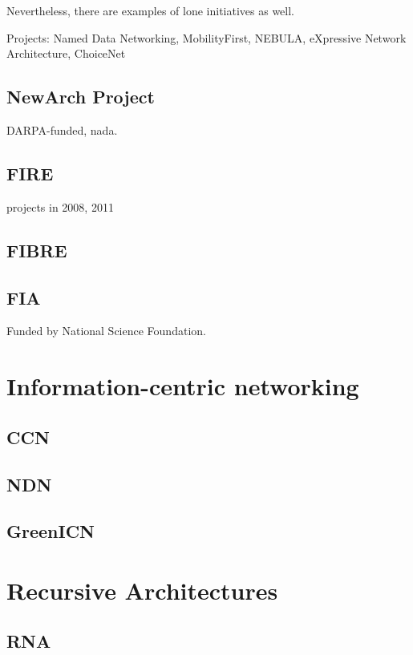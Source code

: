         Nevertheless, there are examples of lone initiatives as well.

        Projects: Named Data Networking, MobilityFirst, NEBULA, eXpressive Network Architecture, ChoiceNet

        \subsection{NewArch Project}

            DARPA-funded, nada.

        \subsection{FIRE}

            projects in 2008, 2011

        \subsection{FIBRE}

        \subsection{FIA}

            Funded by National Science Foundation.

    \section{Information-centric networking}

        \subsection{CCN}
        \subsection{NDN}
        \subsection{GreenICN}

    \section{Recursive Architectures}
        \subsection{RNA}

